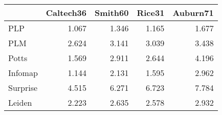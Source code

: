 \begin{tabular}{lrrrr}
\toprule
{} & Caltech36 & Smith60 & Rice31 & Auburn71 \\
\midrule
PLP      &     1.067 &   1.346 &  1.165 &    1.677 \\
PLM      &     2.624 &   3.141 &  3.039 &    3.438 \\
Potts    &     1.569 &   2.911 &  2.644 &    4.196 \\
Infomap  &     1.144 &   2.131 &  1.595 &    2.962 \\
Surprise &     4.515 &   6.271 &  6.723 &    7.784 \\
Leiden   &     2.223 &   2.635 &  2.578 &    2.932 \\
\bottomrule
\end{tabular}

